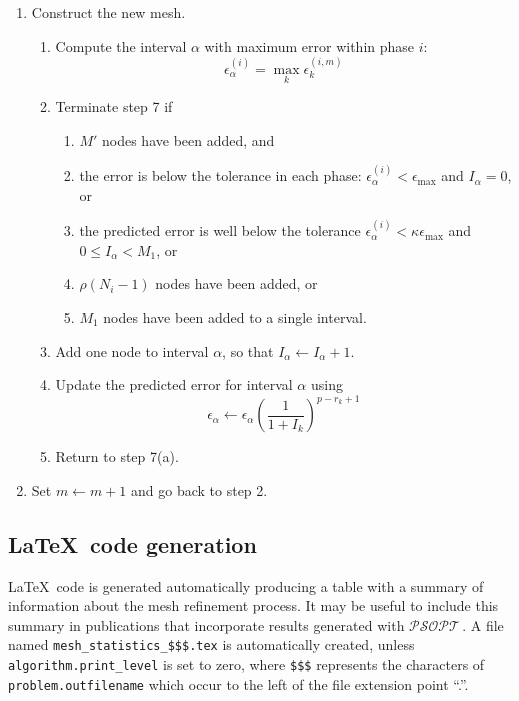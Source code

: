 \documentclass[a4paper,11pt]{report}    %
\newcommand{\psopt}{$\mathcal{PSOPT}$\,}  %
\begin{document}
\begin{enumerate}
\item Construct the new mesh. 
   \begin{enumerate}
    \item Compute the interval $\alpha$ with maximum error within phase $i$:
       \[
           \epsilon_{\alpha}^{(i)} = \max_k \epsilon_k^{(i,m)}
       \]
    \item Terminate step 7 if 
          \begin{enumerate}
           \item $M'$ nodes have been added, and
           \item the error is below the tolerance in each phase: $\epsilon_{\alpha}^{(i)} < \epsilon_{\max}$ and $I_\alpha = 0$, or
           \item the predicted error is well below the tolerance $\epsilon_{\alpha}^{(i)} < \kappa \epsilon_{\max}$ and $0 \le I_{\alpha} < M_1$, or
           \item $\rho (N_i-1)$ nodes have been added, or
           \item $M_1$ nodes have been added to a single interval. 
          \end{enumerate}
    \item Add one node to interval $\alpha$, so that $I_{\alpha} \leftarrow I_{\alpha}+1$.
    \item  Update the predicted error for interval $\alpha$ using 
                     \[
                         \epsilon_{\alpha} \leftarrow \epsilon_{\alpha} \left(  \frac{1}{1+I_k} \right)^{p-r_k+1}
                      \]


    \item Return to step 7(a).
   \end{enumerate}
\item Set $m \leftarrow m+1$ and go back to step 2.



\end{enumerate}

\subsection{\LaTeX \, code generation} \label{sec:latex_table}

\LaTeX \, code is generated automatically producing a table with a summary of information about the mesh refinement process.
It may be useful to include this summary in publications that incorporate results generated with \psopt. A file named \verb|mesh_statistics_$$$.tex|
is automatically created, unless \verb|algorithm.print_level| is set to zero, where \verb|$$$| represents the characters of \verb|problem.outfilename| which occur 
to the left of the file extension point ``.''.
\end{document}
